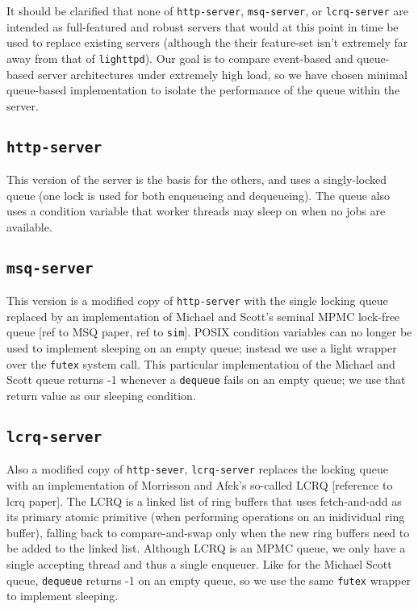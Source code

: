 \documentclass[twoside]{article}
\begin{document}
\begin{multicols}{2}
It should be clarified that none of \verb+http-server+,
\verb+msq-server+, or \verb+lcrq-server+ are intended as full-featured
and robust servers that would at this point in time be used to replace
existing servers (although the their feature-set isn't extremely far
away from that of \verb+lighttpd+). Our goal is to compare event-based
and queue-based server architectures under extremely high load, so we
have chosen minimal queue-based implementation to isolate the
performance of the queue within the server.

\subsection{\texttt{http-server}}

This version of the server is the basis for the others, and uses a
singly-locked queue (one lock is used for both enqueueing and
dequeueing). The queue also uses a condition variable that worker
threads may sleep on when no jobs are available.

\subsection{\texttt{msq-server}}

This version is a modified copy of \verb+http-server+ with the single
locking queue replaced by an implementation of Michael and Scott's
seminal MPMC lock-free queue [ref to MSQ paper, ref to \verb+sim+]. POSIX
condition variables can no longer be used to implement sleeping on an
empty queue; instead we use a light wrapper over the \verb+futex+ system
call. This particular implementation of the Michael and Scott queue
returns -1 whenever a \verb+dequeue+ fails on an empty queue; we use that
return value as our sleeping condition.

\subsection{\texttt{lcrq-server}}

Also a modified copy of \verb+http-sever+, \verb+lcrq-server+ replaces the
locking queue with an implementation of Morrisson and Afek's so-called
LCRQ [reference to lcrq paper]. The LCRQ is a linked list of ring
buffers that uses fetch-and-add as its primary atomic primitive (when
performing operations on an inidividual ring buffer), falling back to
compare-and-swap only when the new ring buffers need to be added to
the linked list. Although LCRQ is an MPMC queue, we only have a single
accepting thread and thus a single enqueuer. Like for the Michael
Scott queue, \verb+dequeue+ returns -1 on an empty queue, so we use the
same \verb+futex+ wrapper to implement sleeping.


\end{multicols}
\end{document}
